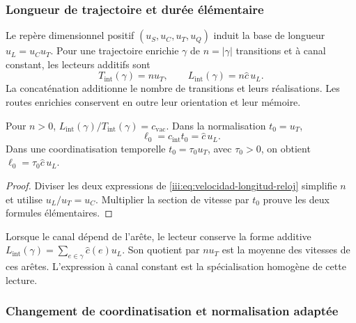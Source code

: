 \subsubsection{Longueur de trajectoire et durée élémentaire}

Le repère dimensionnel positif $(u_S,u_C,u_T,u_Q)$ induit la base de longueur $u_L=u_Cu_T$. Pour une trajectoire enrichie $\gamma$ de $n=|\gamma|$ transitions et à canal constant, les lecteurs additifs sont
\begin{equation}
 T_{\mathrm{int}}(\gamma)=nu_T,
 \qquad L_{\mathrm{int}}(\gamma)=n\widehat c\,u_L.
 \label{iii:eq:velocidad-longitud-reloj}
\end{equation}
La concaténation additionne le nombre de transitions et leurs réalisations.
Les routes enrichies conservent en outre leur orientation et leur mémoire.

\begin{corollary}
Pour $n>0$, $L_{\mathrm{int}}(\gamma)/T_{\mathrm{int}}(\gamma)
=c_{\mathrm{vac}}$. Dans la normalisation $t_0=u_T$,
\begin{equation}
 \ell_0=c_{\mathrm{int}}t_0=\widehat c\,u_L.
 \label{iii:eq:longitud-elemental-constitutiva}
\end{equation}
Dans une coordinatisation temporelle $t_0=\tau_0u_T$, avec $\tau_0>0$, on obtient
$\ell_0=\tau_0\widehat c\,u_L$.
\end{corollary}
\begin{proof}
Diviser les deux expressions de \eqref{iii:eq:velocidad-longitud-reloj} simplifie $n$ et utilise $u_L/u_T=u_C$. Multiplier la section de vitesse par $t_0$ prouve les deux formules élémentaires.
\end{proof}

Lorsque le canal dépend de l’arête, le lecteur conserve la forme additive
$L_{\mathrm{int}}(\gamma)=\sum_{e\in\gamma}\widehat c(e)u_L$.
Son quotient par $nu_T$ est la moyenne des vitesses de ces arêtes.
L’expression à canal constant est la spécialisation homogène de
cette lecture.

\subsubsection{Changement de coordinatisation et normalisation adaptée}


